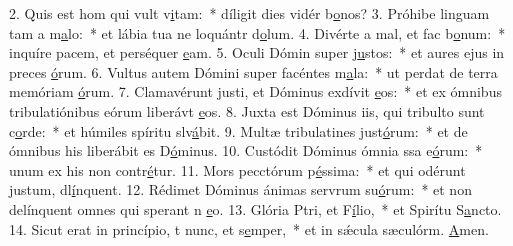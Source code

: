 2. Quis est hom qui vult v\uline{i}tam:~* díligit dies vidér b\uline{o}nos?
3. Próhibe linguam tam a m\uline{a}lo:~* et lábia tua ne loquántr d\uline{o}lum.
4. Divérte a mal, et fac b\uline{o}num:~* inquíre pacem, et perséquer \uline{e}am.
5. Oculi Dómin super j\uline{u}stos:~* et aures ejus in preces \uline{ó}rum.
6. Vultus autem Dómini super facéntes m\uline{a}la:~* ut perdat de terra memóriam \uline{ó}rum.
7. Clamavérunt justi, et Dóminus exdívit \uline{e}os:~* et ex ómnibus tribulatiónibus eórum liberávt \uline{e}os.
8. Juxta est Dóminus iis, qui tribulto sunt c\uline{o}rde:~* et húmiles spíritu slv\uline{á}bit.
9. Multæ tribulatines just\uline{ó}rum:~* et de ómnibus his liberábit es D\uline{ó}minus.
10. Custódit Dóminus ómnia ssa e\uline{ó}rum:~* unum ex his non contr\uline{é}tur.
11. Mors pecctórum p\uline{é}ssima:~* et qui odérunt justum, dl\uline{í}nquent.
12. Rédimet Dóminus ánimas servrum su\uline{ó}rum:~* et non delínquent omnes qui sperant n \uline{e}o.
13. Glória Ptri, et F\uline{í}lio,~* et Spirítu S\uline{a}ncto.
14. Sicut erat in princípio, t nunc, et s\uline{e}mper,~* et in sǽcula sæculórm. \uline{A}men.
